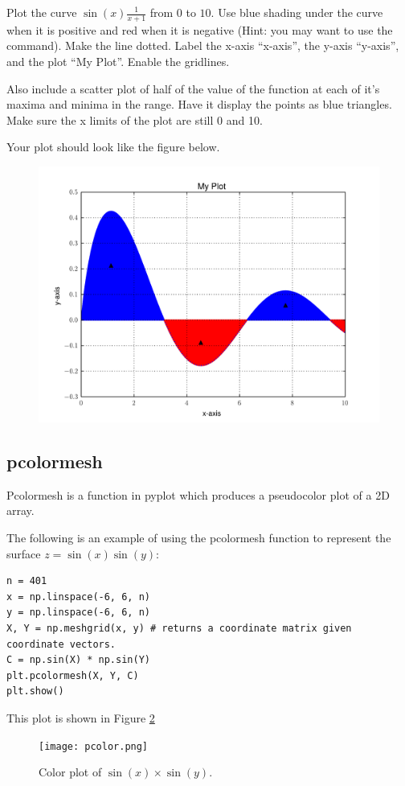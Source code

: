 \begin{problem} Plot the curve $\sin(x)\frac{1}{x+1}$ from $0$ to $10$.
Use blue shading under the curve when it is positive and red when it is
negative (Hint: you may want to use the  command).
Make the line dotted. Label the x-axis ``x-axis'', the y-axis ``y-axis'',
and the plot ``My Plot''. Enable the gridlines.

Also include a scatter plot of half of the value of the function at each
of it's maxima and minima in the range. Have it display the points as
blue triangles. Make sure the x limits of the plot are still 0 and 10.

Your plot should look like the figure below.

\begin{figure}[H]
\includegraphics[width=\textwidth]{soln3.pdf}
\label{fig:problem3} 
\end{figure}
\end{problem}

\subsection*{pcolormesh}
Pcolormesh is a function in pyplot which produces a pseudocolor plot of a 2D array. 

The following is an example of using the pcolormesh function to represent 
the surface $z=\sin(x)\sin(y)$:
\begin{lstlisting}
n = 401 
x = np.linspace(-6, 6, n) 
y = np.linspace(-6, 6, n) 
X, Y = np.meshgrid(x, y) # returns a coordinate matrix given coordinate vectors. 
C = np.sin(X) * np.sin(Y) 
plt.pcolormesh(X, Y, C)
plt.show()
\end{lstlisting}
This plot is shown in Figure \ref{fig:pcmexample}
\begin{figure} 
\texttt{[image: pcolor.png]}
\caption{Color plot of $\sin\left(x\right)\times\sin\left(y\right)$.}
\label{fig:pcmexample} 
\end{figure}


